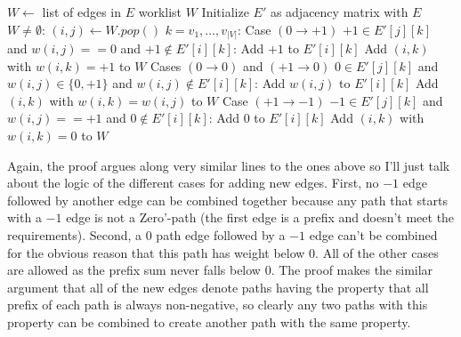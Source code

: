 \documentclass[11pt]{article}
\newenvironment{proof-idea}{\noindent{\bf Proof Idea}\hspace*{1em}}{\qed\bigskip}
\theoremstyle{remark}
\theoremstyle{remark}
\begin{document}
\begin{enumerate}
    \begin{codebox}
      \li $W \gets$ list of edges in $E$ \qquad \Comment worklist $W$
      \li Initialize $E'$ as adjacency matrix with $E$
      \li \While $W \neq \emptyset$:
      \Do
        \li $(i,j) \gets W.pop()$
        \li \For $k=v_1, \ldots, v_{\vert V \vert}$:
            \Do
              \li \Comment Case $(0 \rightarrow +1)$
              \li \If $+1 \in E'[j][k]$ and $w(i,j) == 0$ and $+1 \not \in E'[i][k]$:
              \li \Then Add $+1$ to $E'[i][k]$
              \li Add $(i,k)$ with $w(i,k)=+1$ to $W$
                  \End
              \li
              \li \Comment Cases $(0 \rightarrow 0)$ and $(+1 \rightarrow 0)$
              \li \If $0 \in E'[j][k]$ and $w(i,j) \in \{0,+1\}$ and $w(i,j) \not \in E'[i][k]$:
              \li \Then Add $w(i,j)$ to $E'[i][k]$
              \li Add $(i,k)$ with $w(i,k)=w(i,j)$ to $W$
                  \End
              \li
              \li \Comment Case $(+1 \rightarrow -1)$
              \li \If $-1 \in E'[j][k]$ and $w(i,j) == +1$ and $0 \not \in E'[i][k]$:
              \li \Then Add $0$ to $E'[i][k]$
              \li Add $(i,k)$ with $w(i,k)=0$ to $W$
                  \End
            \End
      \End
    \end{codebox}

    \begin{proof-idea}
      Again, the proof argues along very similar lines to the ones above so I'll just talk about the logic of the different cases for adding new edges. First, no $-1$ edge followed by another edge can be combined together because any path that starts with a $-1$ edge is not a Zero'-path (the first edge is a prefix and doesn't meet the requirements). Second, a 0 path edge followed by a $-1$ edge can't be combined for the obvious reason that this path has weight below 0. All of the other cases are allowed as the prefix sum never falls below 0. The proof makes the similar argument that all of the new edges denote paths having the property that all prefix of each path is always non-negative, so clearly any two paths with this property can be combined to create another path with the same property.
    \end{proof-idea}
  \end{enumerate}

  
\end{document}
